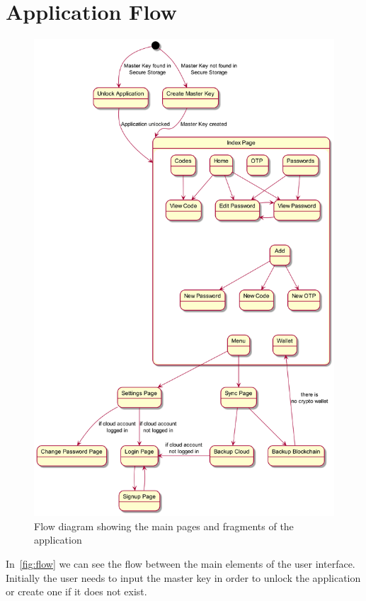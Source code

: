 \documentclass[a4paper,12pt]{report}
\begin{document}
\section{Application Flow}

\begin{figure}[H]
    \centering
    \includegraphics[scale=0.23]{diagrams/state/flow.png}
    \caption{Flow diagram showing the main pages and fragments of the application}\label{fig:flow}
\end{figure}

In~\autoref{fig:flow} we can see the flow between the main elements of the user
interface. Initially the user needs to input the master key in order to unlock
the application or create one if it does not exist.
\end{document}

